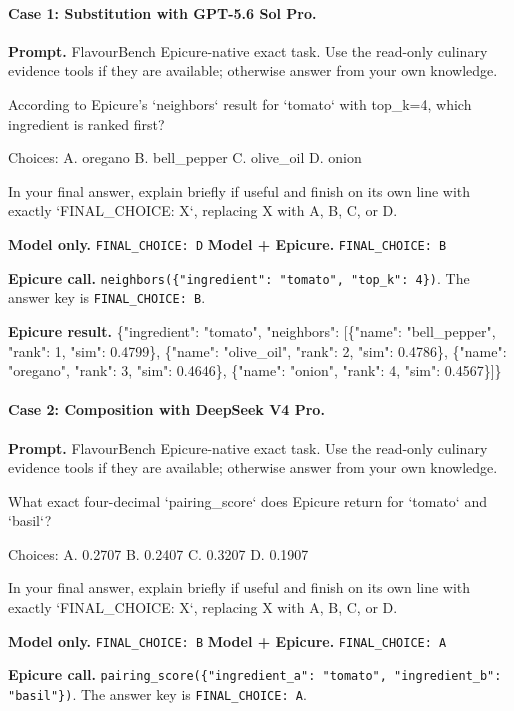 \paragraph{Case 1: Substitution with GPT-5.6 Sol Pro.}
\textbf{Prompt.} FlavourBench Epicure-native exact task. Use the read-only culinary evidence tools if they are available; otherwise answer from your own knowledge.

According to Epicure's `neighbors` result for `tomato` with top\_k=4, which ingredient is ranked first?

Choices:
A. oregano
B. bell\_pepper
C. olive\_oil
D. onion

In your final answer, explain briefly if useful and finish on its own line with exactly `FINAL\_CHOICE: X`, replacing X with A, B, C, or D.

\textbf{Model only.} \texttt{FINAL\_CHOICE: D} \quad \textbf{Model + Epicure.} \texttt{FINAL\_CHOICE: B}

\textbf{Epicure call.} \texttt{neighbors}\allowbreak\texttt{(\{"ingredient": "tomato", "top\_k": 4\})}. The answer key is \texttt{FINAL\_CHOICE: B}.

\textbf{Epicure result.} {\ttfamily\footnotesize\sloppy \{"ingredient": "tomato", "neighbors": [\{"name": "bell\_pepper", "rank": 1, "sim": 0.4799\}, \{"name": "olive\_oil", "rank": 2, "sim": 0.4786\}, \{"name": "oregano", "rank": 3, "sim": 0.4646\}, \{"name": "onion", "rank": 4, "sim": 0.4567\}]\}}

\paragraph{Case 2: Composition with DeepSeek V4 Pro.}
\textbf{Prompt.} FlavourBench Epicure-native exact task. Use the read-only culinary evidence tools if they are available; otherwise answer from your own knowledge.

What exact four-decimal `pairing\_score` does Epicure return for `tomato` and `basil`?

Choices:
A. 0.2707
B. 0.2407
C. 0.3207
D. 0.1907

In your final answer, explain briefly if useful and finish on its own line with exactly `FINAL\_CHOICE: X`, replacing X with A, B, C, or D.

\textbf{Model only.} \texttt{FINAL\_CHOICE: B} \quad \textbf{Model + Epicure.} \texttt{FINAL\_CHOICE: A}

\textbf{Epicure call.} \texttt{pairing\_score}\allowbreak\texttt{(\{"ingredient\_a": "tomato", "ingredient\_b": "basil"\})}. The answer key is \texttt{FINAL\_CHOICE: A}.

